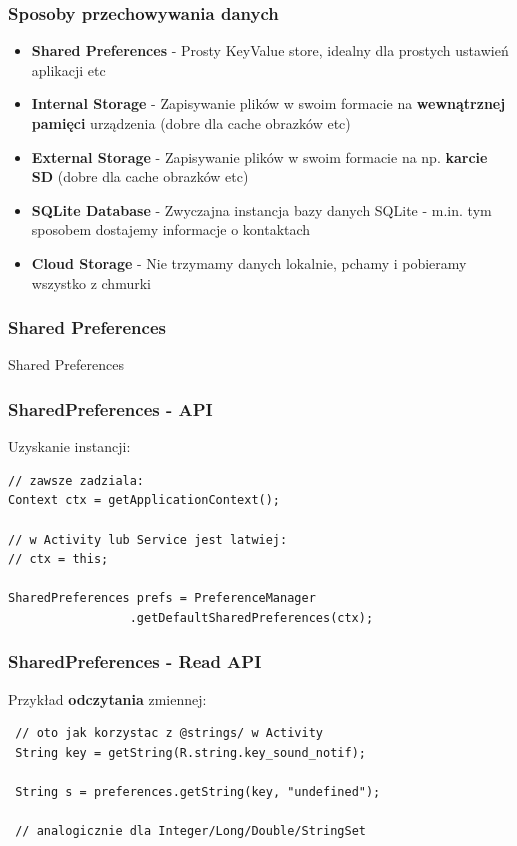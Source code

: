 \begin{frame}\frametitle{Sposoby przechowywania danych}
\begin{itemize}
 \item  \textbf{Shared Preferences} - Prosty KeyValue store, idealny dla prostych ustawień aplikacji etc
 \pause \item \textbf{Internal Storage} - Zapisywanie plików w swoim formacie na \textbf{wewnątrznej pamięci} urządzenia (dobre dla cache obrazków etc)
 \pause \item \textbf{External Storage} - Zapisywanie plików w swoim formacie na np. \textbf{karcie SD} (dobre dla cache obrazków etc)
 \pause \item \textbf{SQLite Database} - Zwyczajna instancja bazy danych SQLite - m.in. tym sposobem dostajemy informacje o kontaktach
 \pause \item \textbf{Cloud Storage} - Nie trzymamy danych lokalnie, pchamy i pobieramy wszystko z chmurki
\end{itemize}
\end{frame}


\begin{frame}\frametitle{Shared Preferences}
\begin{center}
 \Huge{Shared Preferences} 
\end{center}
\end{frame}

\begin{frame}[fragile]\frametitle{SharedPreferences - API}
Uzyskanie instancji:
\begin{lstlisting}
// zawsze zadziala:
Context ctx = getApplicationContext(); 

// w Activity lub Service jest latwiej:
// ctx = this;

SharedPreferences prefs = PreferenceManager
                 .getDefaultSharedPreferences(ctx);
\end{lstlisting}
\end{frame}


\begin{frame}[fragile]\frametitle{SharedPreferences - Read API}
 Przykład \textbf{odczytania} zmiennej:
\begin{lstlisting}
 // oto jak korzystac z @strings/ w Activity
 String key = getString(R.string.key_sound_notif);

 String s = preferences.getString(key, "undefined");
 
 // analogicznie dla Integer/Long/Double/StringSet
\end{lstlisting}
\end{frame}

